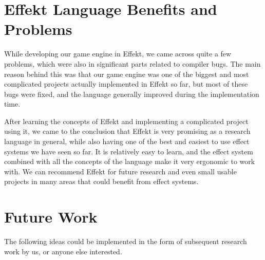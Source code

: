 \section*{Effekt Language Benefits and Problems}

While developing our game engine in Effekt, we came across quite a few problems, which were also in significant parts related to compiler bugs. The main reason behind this was that our game engine was one of the biggest and most complicated projects actually implemented in Effekt so far, but most of these bugs were fixed, and the language generally improved during the implementation time.

After learning the concepts of Effekt and implementing a complicated project using it, we came to the conclusion that Effekt is very promising as a research language in general, while also having one of the best and easiest to use effect systems we have seen so far. It is relatively easy to learn, and the effect system combined with all the concepts of the language make it very ergonomic to work with. We can recommend Effekt for future research and even small usable projects in many areas that could benefit from effect systems.

\section*{Future Work}

The following ideas could be implemented in the form of subsequent research work by us, or anyone else interested.

